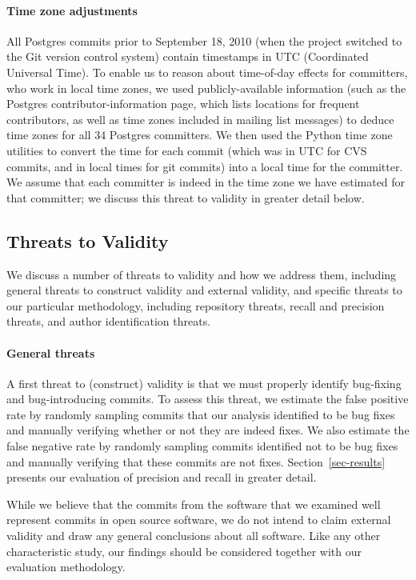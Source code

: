 \paragraph{Time zone adjustments}
All Postgres commits prior to September 18, 2010 (when the project
switched to the Git version control system) contain timestamps in UTC
(Coordinated Universal Time). To enable us to reason about time-of-day
effects for committers, who work in local time zones, we used
publicly-available information (such as the Postgres
contributor-information page, which lists locations for frequent
contributors, as well as time zones included in mailing list messages) to deduce
time zones for all 34 Postgres committers. We then used the Python
time zone utilities to convert the time for each commit (which was in
UTC for CVS commits, and in local times for git commits) into a local
time for the committer. We assume that each committer is indeed in
the time zone we have estimated for that committer; 
we discuss this threat to validity in greater detail below.

\subsection{Threats to Validity}
We discuss a number of threats to validity and how we address them,
including general threats to construct validity and external validity,
and specific threats to our particular methodology, including 
repository threats, recall and precision threats, 
and author identification threats.

\paragraph{General threats}
A first threat to (construct) validity is that we must properly
identify bug-fixing and bug-introducing commits. To assess this
threat, we estimate the false positive rate by randomly sampling
commits that our analysis identified to be bug fixes and manually
verifying whether or not they are indeed fixes.  We also estimate the
false negative rate by randomly sampling commits identified not to be
bug fixes and manually verifying that these commits are not fixes.
Section~\ref{sec-results} presents our evaluation of precision and recall 
in greater detail.

While we believe that the commits from the software that we examined
well represent commits in open source software, we do not intend to
claim external validity and draw any general conclusions about all
software.  Like any other characteristic study, our findings should be
considered together with our evaluation methodology.

